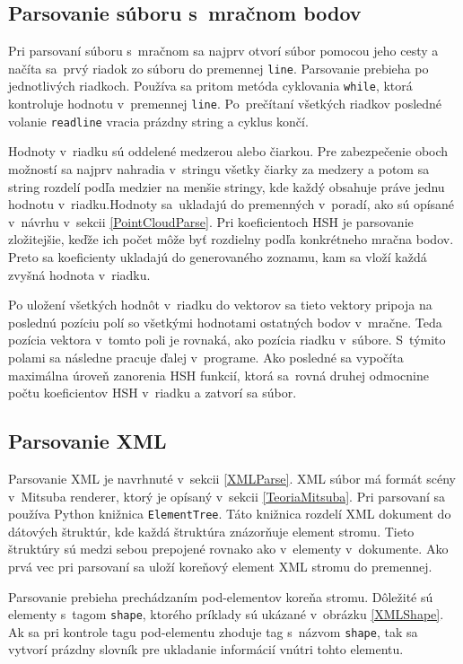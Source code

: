 \subsection*{Parsovanie súboru s~mračnom bodov}
Pri parsovaní súboru s~mračnom sa najprv otvorí súbor pomocou jeho cesty a načíta sa~prvý riadok zo súboru do premennej \verb|line|. Parsovanie prebieha po jednotlivých riadkoch. Používa sa pritom metóda cyklovania \verb|while|, ktorá kontroluje hodnotu v~premennej \verb|line|. Po~prečítaní všetkých riadkov posledné volanie \verb|readline| vracia prázdny string a cyklus končí.

Hodnoty v~riadku sú oddelené medzerou alebo čiarkou. Pre zabezpečenie oboch možností sa najprv nahradia v~stringu všetky čiarky za medzery a potom sa string rozdelí podľa medzier na menšie stringy, kde každý obsahuje práve jednu hodnotu v~riadku.Hodnoty sa~ukladajú do premenných v~poradí, ako sú opísané v~návrhu v~sekcii \ref{PointCloudParse}. Pri koeficientoch HSH je parsovanie zložitejšie, keďže ich počet môže byť rozdielny podľa konkrétneho mračna bodov. Preto sa koeficienty ukladajú do generovaného zoznamu, kam sa vloží každá zvyšná hodnota v~riadku.

Po uložení všetkých hodnôt v~riadku do vektorov sa tieto vektory pripoja na poslednú pozíciu polí so všetkými hodnotami ostatných bodov v~mračne. Teda pozícia vektora v~tomto poli je rovnaká, ako pozícia riadku v~súbore. S~týmito polami sa následne pracuje ďalej v~programe. Ako posledné sa vypočíta maximálna úroveň zanorenia HSH funkcií, ktorá sa~rovná druhej odmocnine počtu koeficientov HSH v~riadku a zatvorí sa súbor.

\subsection*{Parsovanie XML}
Parsovanie XML je navrhnuté v~sekcii \ref{XMLParse}. XML súbor má formát scény v~Mitsuba renderer, ktorý je opísaný v~sekcii \ref{TeoriaMitsuba}. Pri parsovaní sa používa Python knižnica \verb|ElementTree|. Táto knižnica rozdelí XML dokument do dátových štruktúr, kde každá štruktúra znázorňuje element stromu. Tieto štruktúry sú medzi sebou prepojené rovnako ako v~elementy v~dokumente. Ako prvá vec pri parsovaní sa uloží koreňový element XML stromu do premennej.

Parsovanie prebieha prechádzaním pod-elementov koreňa stromu. Dôležité sú elementy s~tagom \verb|shape|, ktorého príklady sú ukázané v~obrázku \ref{XMLShape}. Ak sa pri kontrole tagu pod-elementu zhoduje tag s~názvom \verb|shape|, tak sa vytvorí prázdny slovník pre ukladanie informácií vnútri tohto elementu.

